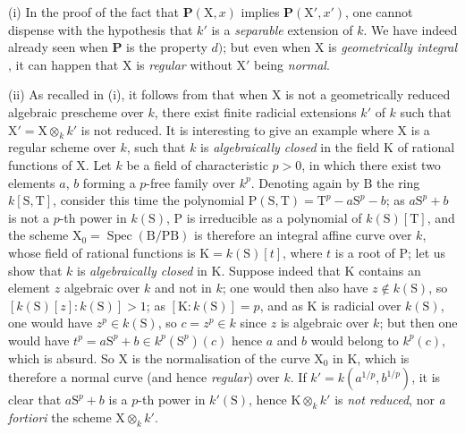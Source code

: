 \begin{remarks}[6.7.5]
\label{IV.6.7.5}
(i) In the proof of the fact that $\boldsymbol{P}(\mathrm{X}, x)$ implies $\boldsymbol{P}(\mathrm{X}', x')$, one cannot dispense with the hypothesis that $k'$ is a \emph{separable} extension of $k$. We have indeed already seen  when $\boldsymbol{P}$ is the property $d)$; but even when $\mathrm{X}$ is \emph{geometrically integral} , it can happen that $\mathrm{X}$ is \emph{regular} without $\mathrm{X}'$ being \emph{normal}.


(ii) As recalled in (i), it follows from  that when $\mathrm{X}$ is not a geometrically reduced algebraic prescheme over $k$, there exist finite radicial extensions $k'$ of $k$ such that $\mathrm{X}'=\mathrm{X}\otimes_k k'$ is not reduced. It is interesting to give an example where $\mathrm{X}$ is a regular scheme over $k$, such that $k$ is \emph{algebraically closed} in the field $\mathrm{K}$ of rational functions of $\mathrm{X}$. Let $k$ be a field of characteristic $p>0$, in which there exist two elements $a$, $b$ forming a $p$-free family over $k^p$. Denoting again by $\mathrm{B}$ the ring $k[\mathrm{S},\mathrm{T}]$, consider this time the polynomial $\mathrm{P}(\mathrm{S},\mathrm{T})=\mathrm{T}^p-a\mathrm{S}^p-b$; as $a\mathrm{S}^p+b$ is not a $p$-th power in $k(\mathrm{S})$, $\mathrm{P}$ is irreducible as a polynomial of $k(\mathrm{S})[\mathrm{T}]$, and the scheme $\mathrm{X}_0=\operatorname{Spec}(\mathrm{B}/\mathrm{PB})$ is therefore an integral affine curve over $k$, whose field of rational functions is $\mathrm{K}=k(\mathrm{S})[t]$, where $t$ is a root of $\mathrm{P}$; let us show that $k$ is \emph{algebraically closed} in $\mathrm{K}$. Suppose indeed that $\mathrm{K}$ contains an element $z$ algebraic over $k$ and not in $k$; one would then also have $z\notin k(\mathrm{S})$, so $[k(\mathrm{S})[z]:k(\mathrm{S})]>1$; as $[\mathrm{K}:k(\mathrm{S})]=p$, and as $\mathrm{K}$ is radicial over $k(\mathrm{S})$, one would have $z^p\in k(\mathrm{S})$, so $c=z^p\in k$ since $z$ is algebraic over $k$; but then one would have $t^p=a\mathrm{S}^p+b\in k^p(\mathrm{S}^p)(c)$ hence $a$ and $b$ would belong to $k^p(c)$, which is absurd. So $\mathrm{X}$ is the normalisation of the curve $\mathrm{X}_0$ in $\mathrm{K}$, which is therefore a normal curve (and hence \emph{regular}) over $k$. If $k'=k(a^{1/p},b^{1/p})$, it is clear that $a\mathrm{S}^p+b$ is a $p$-th power in $k'(\mathrm{S})$, hence $\mathrm{K}\otimes_k k'$ is \emph{not reduced}, nor \emph{a fortiori} the scheme $\mathrm{X}\otimes_k k'$.
\end{remarks}

